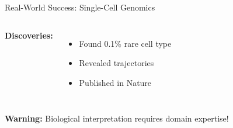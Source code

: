\documentclass[aspectratio=169]{beamer}
\newcommand{\warning}[1]{\colorbox{red!10}{\textcolor{warningcolor}{\textbf{Warning:} #1}}}
\begin{document}
\begin{frame}{Real-World Success: Single-Cell Genomics}
\begin{columns}

\vspace{0.2cm}
\textbf{Discoveries:}
\begin{itemize}
\item Found 0.1\% rare cell type
\item Revealed trajectories
\item Published in Nature
\end{itemize}
\end{columns}

\vspace{0.2cm}
\warning{Biological interpretation requires domain expertise!}
\end{frame}
\end{document}
